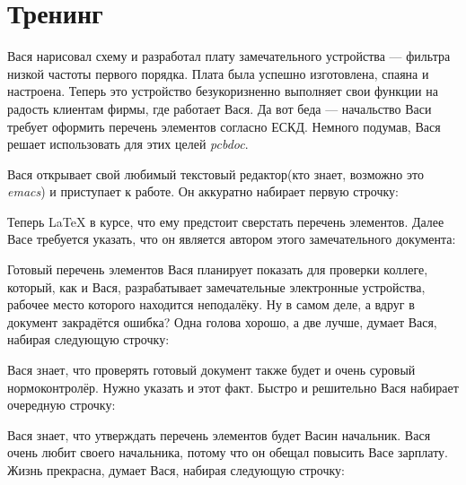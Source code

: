 
\section{Тренинг}

Вася нарисовал схему и разработал плату замечательного устройства --- фильтра
низкой частоты первого порядка. Плата была успешно изготовлена, спаяна и
настроена. Теперь это устройство безукоризненно выполняет свои функции на радость
клиентам фирмы, где работает Вася. Да вот беда --- начальство Васи требует
оформить перечень элементов согласно ЕСКД. Немного подумав, Вася решает
использовать для этих целей \emph{pcbdoc}.

Вася открывает свой любимый текстовый редактор(кто знает, возможно это
\emph{emacs}) и приступает к работе. Он аккуратно набирает первую строчку:


Теперь \LaTeX{} в курсе, что ему предстоит сверстать перечень элементов.
Далее Васе требуется указать, что он является автором этого замечательного
документа:


Готовый перечень элементов Вася планирует показать для проверки коллеге, который,
как и Вася, разрабатывает замечательные электронные устройства, рабочее место
которого находится неподалёку. Ну в самом деле, а вдруг в документ закрадётся
ошибка? Одна голова хорошо, а две лучше, думает Вася, набирая следующую
строчку:


Вася знает, что проверять готовый документ также будет и очень суровый
нормоконтролёр. Нужно указать и этот факт. Быстро и решительно Вася набирает
очередную строчку:


Вася знает, что утверждать перечень элементов будет Васин начальник. Вася очень
любит своего начальника, потому что он обещал повысить Васе зарплату. Жизнь
прекрасна, думает Вася, набирая следующую строчку:


